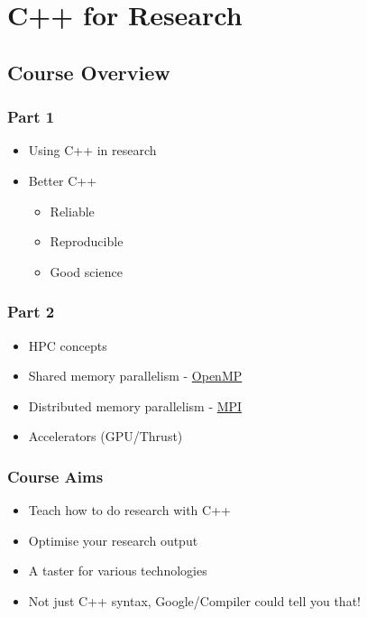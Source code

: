 \section{C++ for Research}\label{c-for-research}

\subsection{Course Overview}\label{course-overview}

\subsubsection{Part 1}\label{part-1}

\begin{itemize}
\itemsep1pt\parskip0pt
\item
  Using C++ in research
\item
  Better C++

  \begin{itemize}
  \itemsep1pt\parskip0pt
  \item
    Reliable
  \item
    Reproducible
  \item
    Good science
  \end{itemize}
\end{itemize}

\subsubsection{Part 2}\label{part-2}

\begin{itemize}
\itemsep1pt\parskip0pt
\item
  HPC concepts
\item
  Shared memory parallelism - \href{http://www.openmp.org}{OpenMP}
\item
  Distributed memory parallelism - \href{http://www.open-mpi.org}{MPI}
\item
  Accelerators (GPU/Thrust)
\end{itemize}

\subsubsection{Course Aims}\label{course-aims}

\begin{itemize}
\itemsep1pt\parskip0pt
\item
  Teach how to do research with C++
\item
  Optimise your research output
\item
  A taster for various technologies
\item
  Not just C++ syntax, Google/Compiler could tell you that!
\end{itemize}

